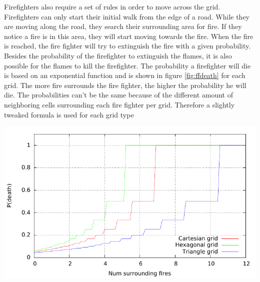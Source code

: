 \documentclass{article}
\newenvironment{Figure}
  {\par\medskip\noindent\minipage{\linewidth}}
  {\endminipage\par\medskip}
\begin{document}
\begin{multicols}{2}
Firefighters also require a set of rules in order to move across the grid. Firefighters can only start their initial walk from the edge of a road. While they are moving along the road, they search their surrounding area for fire. If they notice a fire is in this area, they will start moving towards the fire. When the fire is reached, the fire fighter will try to extinguish the fire with a given probability. Besides the probability of the firefighter to extinguish the flames, it is also possible for the flames to kill the firefighter. The probability a firefighter will die is based on an exponential function and is shown in figure \ref{fig:ffdeath} for each grid. The more fire surrounds the fire fighter, the higher the probability he will die. The probabilities can’t be the same because of the different amount of neighboring cells surrounding each fire fighter per grid. Therefore a slightly tweaked formula is used for each grid type
\begin{Figure}
 \centering
 \includegraphics[width=1.1\textwidth]{imgs/plot/ffdeath.pdf}
\label{fig:ffdeath}
\end{Figure}


\end{multicols}
\end{document}
